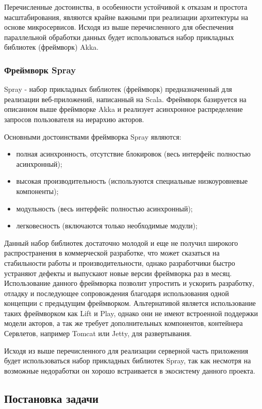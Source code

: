 Перечисленные достоинства, в особенности устойчивой к отказам и простота масштабирования, являются крайне важными при реализации архитектуры на основе микросервисов. Исходя из выше перечисленного для обеспечения параллельной обработки данных будет использоваться набор прикладных библиотек (фреймворк) Akka. 

\subsubsection{Фреймворк Spray}
\label{sec:techs:spray}

Spray - набор прикладных библиотек (фреймворк) предназначенный для реализации веб-приложений, написанный на Scala. Фреймворк базируется на описанном выше фреймворке Akka и реализует асинхронное распределение запросов пользователя на иерархию акторов. 

Основными достоинствами фреймворка Spray являются:
\begin{itemize}
  \item полная асинхронность, отсутствие блокировок (весь интерфейс полностью асинхронный);
  \item высокая производительность (используются специальные низкоуровневые компоненты);
  \item модульность (весь интерфейс полностью асинхронный);
  \item легковесность (включаются только необходимые модули);
\end{itemize}

Данный набор библиотек достаточно молодой и еще не получил широкого распространения в коммерческой разработке, что может сказаться на стабильности работы и производительности, однако разработчики быстро устраняют дефекты и выпускают новые версии фреймворка раз в месяц. Использование данного фреймворка позволит упростить и ускорить разработку, отладку и последующее сопровождения благодаря использования одной концепции с предыдущим фреймворком.
Альтернативой является использование таких фреймворком как Lift и Play, однако они не имеют встроенной поддержки модели акторов, а так же требует дополнительных компонентов, контейнера Сервлетов, например Tomcat или Jetty, для развертывания.

Исходя из выше перечисленного для реализации серверной часть приложения будет использоваться набор прикладных библиотек Spray, так как несмотря на возможные недоработки он хорошо встраивается в экосистему данного проекта.
\subsection{Постановка задачи}
\label{sec:domain:requirements}

